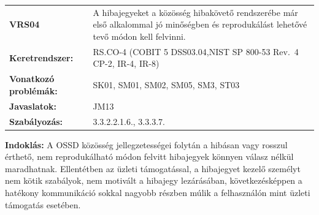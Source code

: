\documentclass[12pt,magyar,a4paper,oneside]{scrreprt}
\begin{document}
\begin{longtable}[]{@{}ll@{}}
\toprule
\endhead
\begin{minipage}[t]{0.16\columnwidth}\raggedright
\textbf{VRS04}\strut
\end{minipage} & \begin{minipage}[t]{0.79\columnwidth}\raggedright
A hibajegyeket a közösség hibakövető rendszerébe már első alkalommal jó
minőségben és reprodukálást lehetővé tevő módon kell felvinni.\strut
\end{minipage}\tabularnewline
\begin{minipage}[t]{0.16\columnwidth}\raggedright
\textbf{Keretrendszer:}\strut
\end{minipage} & \begin{minipage}[t]{0.79\columnwidth}\raggedright
RS.CO-4 (COBIT 5 DSS03.04,NIST SP 800-53 Rev.~4 CP-2, IR-4, IR-8)\strut
\end{minipage}\tabularnewline
\begin{minipage}[t]{0.16\columnwidth}\raggedright
\textbf{Vonatkozó problémák:}\strut
\end{minipage} & \begin{minipage}[t]{0.79\columnwidth}\raggedright
SK01, SM01, SM02, SM05, SM3, ST03\strut
\end{minipage}\tabularnewline
\begin{minipage}[t]{0.16\columnwidth}\raggedright
\textbf{Javaslatok:}\strut
\end{minipage} & \begin{minipage}[t]{0.79\columnwidth}\raggedright
JM13\strut
\end{minipage}\tabularnewline
\begin{minipage}[t]{0.16\columnwidth}\raggedright
\textbf{Szabályozás:}\strut
\end{minipage} & \begin{minipage}[t]{0.79\columnwidth}\raggedright
3.3.2.2.1.6., 3.3.3.7.\strut
\end{minipage}\tabularnewline
\bottomrule
\end{longtable}

\textbf{Indoklás: } A OSSD közösség jellegzetességei folytán a hibásan
vagy rosszul érthető, nem reprodukálható módon felvitt hibajegyek
könnyen válasz nélkül maradhatnak. Ellentétben az üzleti támogatással, a
hibajegyet kezelő személyt nem kötik szabályok, nem motivált a hibajegy
lezárásában, következésképpen a hatékony kommunikáció sokkal nagyobb
részben múlik a felhasználón mint üzleti támogatás esetében.
\end{document}
